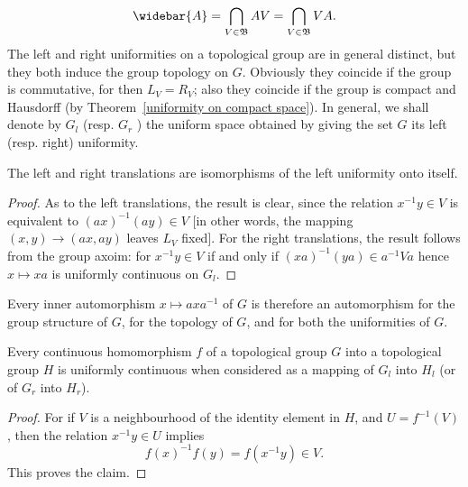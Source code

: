 \[\widebar{A}=\bigcap_{V\in\mathfrak{B}}AV=\bigcap_{V\in\mathfrak{B}}VA.\]
The left and right uniformities on a topological group are in general distinct, but they both induce the group topology on $G$. Obviously they coincide if the group is commutative, for then $L_V=R_V$; also they coincide if the group is compact and Hausdorff (by Theorem~\ref{uniformity on compact space}). In general, we shall denote by $G_l$ (resp. $G_r$ ) the uniform space obtained by giving the set $G$ its left (resp. right) uniformity.
\begin{proposition}
The left and right translations are isomorphisms of the left uniformity onto itself.
\end{proposition}
\begin{proof}
As to the left translations, the result is clear, since the relation $x^{-1}y\in V$ is equivalent to $(ax)^{-1}(ay)\in V$ [in other words, the mapping $(x,y)\to(ax,ay)$ leaves $L_V$ fixed]. For the right translations, the result follows from the group axoim: for $x^{-1}y\in V$ if and only if $(xa)^{-1}(ya)\in a^{-1}Va$ hence $x\mapsto xa$ is uniformly continuous on $G_l$.
\end{proof}
Every inner automorphism $x\mapsto axa^{-1}$ of $G$ is therefore an automorphism for the group structure of $G$, for the topology of $G$, and for both the uniformities of $G$.
\begin{proposition}\label{topological group homomorphism is uniformly continuous}
Every continuous homomorphism $f$ of a topological group $G$ into a topological group $H$ is uniformly continuous when considered as a mapping of $G_l$ into $H_l$ (or of $G_r$ into $H_r$).
\end{proposition}
\begin{proof}
For if $V$ is a neighbourhood of the identity element in $H$, and $U=f^{-1}(V)$, then the relation $x^{-1}y\in U$ implies
\[f(x)^{-1}f(y)=f(x^{-1}y)\in V.\]
This proves the claim.
\end{proof}
